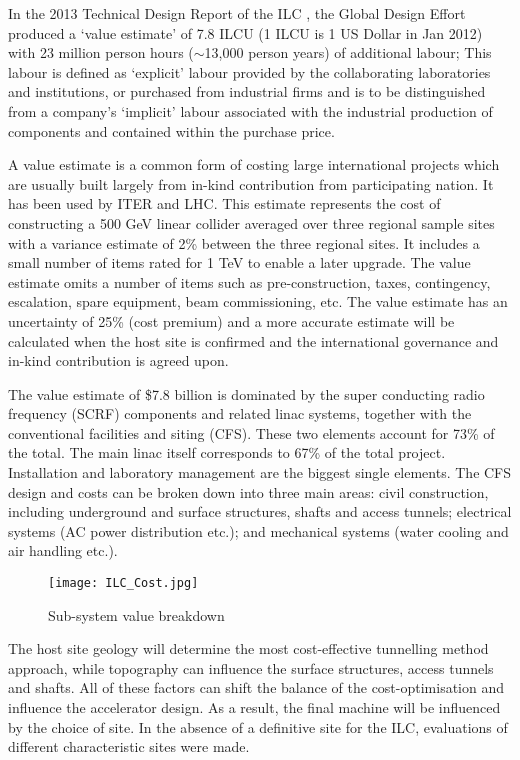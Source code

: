 In the 2013 Technical Design Report of the ILC \cite{ILC:TechnicalDesignReport}, the Global Design Effort produced a `value estimate' of 7.8 ILCU (1 ILCU is 1 US Dollar in Jan 2012) with 23 million person hours ($\sim$13,000 person years) of additional labour; This labour is defined as `explicit' labour provided by the collaborating laboratories and institutions, or purchased from industrial firms and is to be distinguished from a company's `implicit' labour associated with the industrial production of components and contained within the purchase price.  
 
A value estimate is a common form of costing large international projects which are usually built largely from in-kind contribution from participating nation. It has been used by ITER and LHC. This estimate represents the cost of constructing a 500 GeV linear collider averaged over three regional sample sites \textendash with a variance estimate of 2\% between the three regional sites. It includes a small number of items rated for 1 TeV to enable a later upgrade. The value estimate omits a number of items such as pre-construction, taxes, contingency, escalation, spare equipment, beam commissioning, etc. The value estimate has an uncertainty of 25\% (cost premium) and a more accurate estimate will be calculated when the host site is confirmed and the international governance and in-kind contribution is agreed upon.
 
The value estimate of \$7.8 billion is dominated by the super conducting radio frequency (SCRF) components and related linac systems, together with the conventional facilities and siting (CFS). These two elements account for 73\% of the total. The main linac itself corresponds to 67\% of the total project. Installation and laboratory management are the biggest single elements. The CFS design and costs can be broken down into three main areas: civil construction, including underground and surface structures, shafts and access tunnels; electrical systems (AC power distribution etc.); and mechanical systems (water cooling and air handling etc.).
 
\begin{figure}[!htb]
\centering
\texttt{[image: ILC\_Cost.jpg]}
\caption{Sub-system value breakdown \cite{ILC:TechnicalDesignReport}}
\end{figure}
 
The host site geology will determine the most cost-effective tunnelling method approach, while topography can influence the surface structures, access tunnels and shafts. All of these factors can shift the balance of the cost-optimisation and influence the accelerator design. As a result, the final machine will be influenced by the choice of site. In the absence of a definitive site for the ILC, evaluations of different characteristic sites were made. \cite{ILC:TechnicalDesignReport}
 
